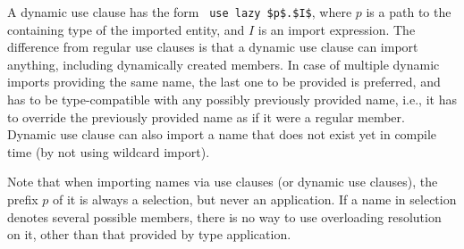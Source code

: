 A dynamic use clause has the form ~\lstinline!use lazy $p$.$I$!, where $p$ is a path to the containing type of the imported entity, and $I$ is an import expression. The difference from regular use clauses is that a dynamic use clause can import anything, including dynamically created members. In case of multiple dynamic imports providing the same name, the last one to be provided is preferred, and has to be type-compatible with any possibly previously provided name, i.e., it has to override the previously provided name as if it were a regular member. Dynamic use clause can also import a name that does not exist yet in compile time (by not using wildcard import). 

Note that when importing names via use clauses (or dynamic use clauses), the prefix $p$ of it is always a selection, but never an application. If a name in selection denotes several possible members, there is no way to use overloading resolution on it, other than that provided by type application. 





